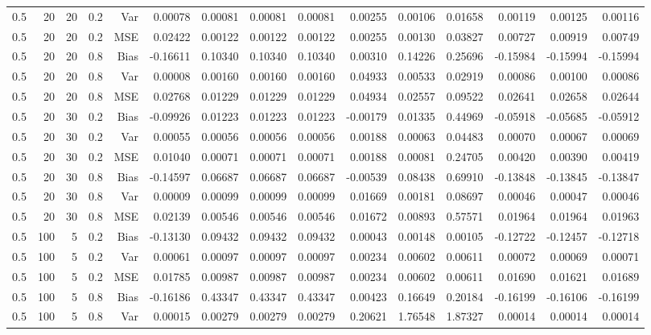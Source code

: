 \begin{table}[!htbp]
\begin{tabular}{lrrrrrrrrrrrrrr}
0.5 &  20 & 20 & 0.2 & Var & 0.00078 & 0.00081 & 0.00081 & 0.00081 & 0.00255 & 0.00106 & 0.01658 & 0.00119 & 0.00125 & 0.00116 \\
0.5 &  20 & 20 & 0.2 & MSE & 0.02422 & 0.00122 & 0.00122 & 0.00122 & 0.00255 & 0.00130 & 0.03827 & 0.00727 & 0.00919 & 0.00749 \\
0.5 &  20 & 20 & 0.8 & Bias & -0.16611 & 0.10340 & 0.10340 & 0.10340 & 0.00310 & 0.14226 & 0.25696 & -0.15984 & -0.15994 & -0.15994 \\
0.5 &  20 & 20 & 0.8 & Var & 0.00008 & 0.00160 & 0.00160 & 0.00160 & 0.04933 & 0.00533 & 0.02919 & 0.00086 & 0.00100 & 0.00086 \\
0.5 &  20 & 20 & 0.8 & MSE & 0.02768 & 0.01229 & 0.01229 & 0.01229 & 0.04934 & 0.02557 & 0.09522 & 0.02641 & 0.02658 & 0.02644 \\
0.5 &  20 & 30 & 0.2 & Bias & -0.09926 & 0.01223 & 0.01223 & 0.01223 & -0.00179 & 0.01335 & 0.44969 & -0.05918 & -0.05685 & -0.05912 \\
0.5 &  20 & 30 & 0.2 & Var & 0.00055 & 0.00056 & 0.00056 & 0.00056 & 0.00188 & 0.00063 & 0.04483 & 0.00070 & 0.00067 & 0.00069 \\
0.5 &  20 & 30 & 0.2 & MSE & 0.01040 & 0.00071 & 0.00071 & 0.00071 & 0.00188 & 0.00081 & 0.24705 & 0.00420 & 0.00390 & 0.00419 \\
0.5 &  20 & 30 & 0.8 & Bias & -0.14597 & 0.06687 & 0.06687 & 0.06687 & -0.00539 & 0.08438 & 0.69910 & -0.13848 & -0.13845 & -0.13847 \\
0.5 &  20 & 30 & 0.8 & Var & 0.00009 & 0.00099 & 0.00099 & 0.00099 & 0.01669 & 0.00181 & 0.08697 & 0.00046 & 0.00047 & 0.00046 \\
0.5 &  20 & 30 & 0.8 & MSE & 0.02139 & 0.00546 & 0.00546 & 0.00546 & 0.01672 & 0.00893 & 0.57571 & 0.01964 & 0.01964 & 0.01963 \\
0.5 & 100 &  5 & 0.2 & Bias & -0.13130 & 0.09432 & 0.09432 & 0.09432 & 0.00043 & 0.00148 & 0.00105 & -0.12722 & -0.12457 & -0.12718 \\
0.5 & 100 &  5 & 0.2 & Var & 0.00061 & 0.00097 & 0.00097 & 0.00097 & 0.00234 & 0.00602 & 0.00611 & 0.00072 & 0.00069 & 0.00071 \\
0.5 & 100 &  5 & 0.2 & MSE & 0.01785 & 0.00987 & 0.00987 & 0.00987 & 0.00234 & 0.00602 & 0.00611 & 0.01690 & 0.01621 & 0.01689 \\
0.5 & 100 &  5 & 0.8 & Bias & -0.16186 & 0.43347 & 0.43347 & 0.43347 & 0.00423 & 0.16649 & 0.20184 & -0.16199 & -0.16106 & -0.16199 \\
0.5 & 100 &  5 & 0.8 & Var & 0.00015 & 0.00279 & 0.00279 & 0.00279 & 0.20621 & 1.76548 & 1.87327 & 0.00014 & 0.00014 & 0.00014 \\

\end{tabular}
\end{table}
